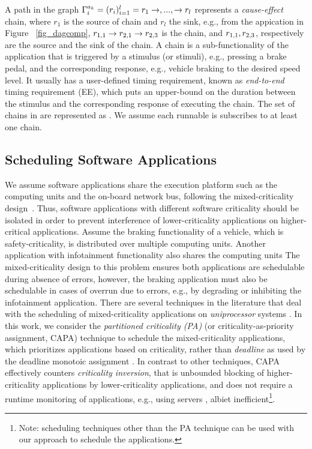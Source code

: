 A path in the graph $\sss{\Gamma}=(r_i)_{i=1}^l=r_1\rightarrow,...,\rightarrow r_l$ represents a \textit{cause-effect} chain, where $r_1$ is the source of chain and $r_l$ the sink, e.g., from the appication \ttar[1]in Figure~ \ref{fig_dagcomp}, $\ssb{r}[1,1]\rightarrow \ssb{r}[2,1]\rightarrow \ssb{r}[2,3]$ is the chain, and $\ssb{r}[1,1],\ssb{r}[2,3]$, respectively are the source and the sink of the chain. A chain is a sub-functionality of the application that is triggered by a stimulus (or stimuli), e.g., pressing a brake pedal, and the corresponding response, e.g.,  vehicle braking to the desired speed level. It usually has a user-defined timing requirement, known as \textit{end-to-end} timing requirement (EE), which puts an upper-bound on the duration between the stimulus and the corresponding response of executing the chain. The set of chains in \ttar are represented as \sexpsp{\Gamma}{\Gamma}. We assume each runnable is subscribes to at least one chain.

\subsection{Scheduling Software Applications}
We assume software applications share the execution platform such as the computing units and the on-board network bus, following the mixed-criticality design~\cite{Vestal2007PreemptiveAssurance}. Thus, software applications with different software criticality should be isolated in order to prevent interference of lower-criticality applications on higher-critical applications. Assume the braking functionality of a vehicle, which is safety-criticality, is distributed over multiple computing units. Another application with infotainment functionality also shares the computing units The mixed-criticality design to this problem ensures both applications are schedulable during absence of errors, however, the braking application must also be schedulable in cases of overrun due to errors, e.g., by degrading or inhibiting the infotainment application. There are several techniques in the literature that deal with the scheduling of mixed-criticality applications on \textit{uniprocessor} systems \cite{Vestal2007PreemptiveAssurance}. In this work, we consider the \textit{partitioned criticality (PA)} (or criticality-as-priority assignment, CAPA) technique to schedule the mixed-criticality applications, which prioritizes applications based on criticality, rather than \textit{deadline} as used by the deadline monotoic assignment \cite{Baruah2011Response-timeSystems}. In contrast to other techniques, CAPA effectively counters \textit{criticality inversion}, that is unbounded blocking of higher-criticality applications by lower-criticality applications, and does not require a runtime monitoring of applications, e.g., using servers \cite{AbeniIntegratingSystems,Ashjaei2017DesigningSystems,Inam2014ThePlatforms}, albiet inefficient\footnote{Note: scheduling techniques other than the PA technique can be used with our approach to schedule the applications.}. 

